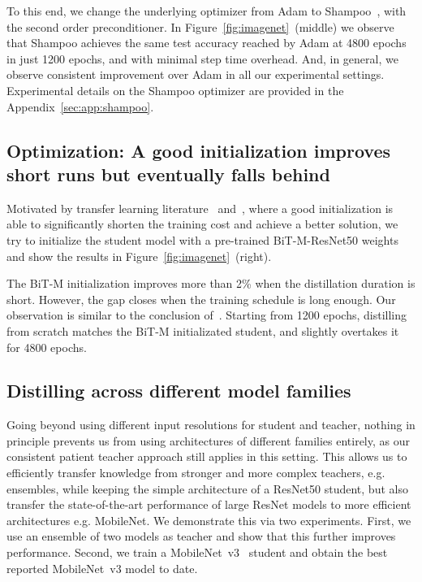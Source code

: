 \documentclass[10pt,twocolumn,letterpaper]{article}
\begin{document}
To this end, we change the underlying optimizer from Adam to Shampoo~\cite{anil2021scalable}, with the second order preconditioner. In Figure~\ref{fig:imagenet}~(middle) we observe that Shampoo achieves the same test accuracy reached by Adam at 4800 epochs in just 1200 epochs, and with minimal step time overhead. And, in general, we observe consistent improvement over Adam in all our experimental settings. Experimental details on the Shampoo optimizer are provided in the Appendix~\ref{sec:app:shampoo}. 

\subsection{Optimization: A good initialization improves short runs but eventually falls behind}
\label{sec:limitations2}

Motivated by transfer learning literature~\cite{he2018rethinking, brain2020bit} and~\cite{shen2020mealv2}, where a good initialization is able to significantly shorten the training cost and achieve a better solution, we try to initialize the student model with a pre-trained BiT-M-ResNet50 weights and show the results in Figure~\ref{fig:imagenet}~(right).

The BiT-M initialization improves more than 2\% when the distillation duration is short.
However, the gap closes when the training schedule is long enough. 
Our observation is similar to the conclusion of~\cite{he2018rethinking}. Starting from 1200 epochs, distilling from scratch matches the BiT-M initializated student, and slightly overtakes it for 4800 epochs. 

\subsection{Distilling across different model families}

Going beyond using different input resolutions for student and teacher, nothing in principle prevents us from using architectures of different families entirely, as our consistent patient teacher approach still applies in this setting. This allows us to efficiently transfer knowledge from stronger and more complex teachers, e.g. ensembles, while keeping the simple architecture of a ResNet50 student, but also transfer the state-of-the-art performance of large ResNet models to more efficient architectures e.g. MobileNet.
We demonstrate this via two experiments.
First, we use an ensemble of two models as teacher and show that this further improves performance.
Second, we train a MobileNet~v3~\cite{howard2019searching} student and obtain the best reported MobileNet~v3 model to date.
\end{document}
